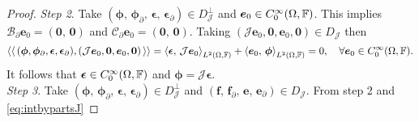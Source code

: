 \begin{proposition}
\begin{proof}
\textit{Step 2}. Take $(\bm{\phi}, \, \bm{\phi}_\partial, \, \bm{\epsilon}, \, \bm{\epsilon}_\partial) \in {D}_{\mathcal{J}}^\perp$ and $\bm{e}_0 \in C_0^\infty(\Omega, \bbF)$. This implies $\mathcal{B}_\partial \bm{e}_0 = (\bm{0},\, \bm{0})$ and $\mathcal{C}_\partial \bm{e}_0 = (\bm{0},\, \bm{0})$. Taking $(\mathcal{J}\bm{e}_0, \bm{0}, \bm{e}_0, \bm{0}) \in {D}_{\mathcal{J}}$ then 
\begin{equation*}
\bilprod{(\bm{\phi}, \bm{\phi}_\partial,  \bm{\epsilon}, \bm{\epsilon}_\partial)}{(\mathcal{J}\bm{e}_0, \bm{0}, \bm{e}_0, \bm{0})} = \inner[L^2(\Omega, \bbF)]{\bm{\epsilon}}{\mathcal{J}\bm{e}_0} + \inner[L^2(\Omega, \bbF)]{\bm{e}_0}{\bm{\phi}} = 0, \quad \forall \bm{e}_0 \in C_0^\infty(\Omega, \bbF).
\end{equation*}
It follows that $\bm{\epsilon} \in C_0^\infty(\Omega, \bbF)$ and $\bm{\phi}=\mathcal{J}\bm{\epsilon}$. \\

\textit{Step 3}. Take $(\bm{\phi}, \, \bm{\phi}_\partial, \, \bm{\epsilon}, \, \bm{\epsilon}_\partial) \in {D}_{\mathcal{J}}^\perp$ and $(\bm{f}, \, \bm{f}_\partial, \, \bm{e}, \, \bm{e}_\partial) \in {D}_{\mathcal{J}}$. From step 2 and \eqref{eq:intbypartsJ}


\end{proof}
\end{proposition}
